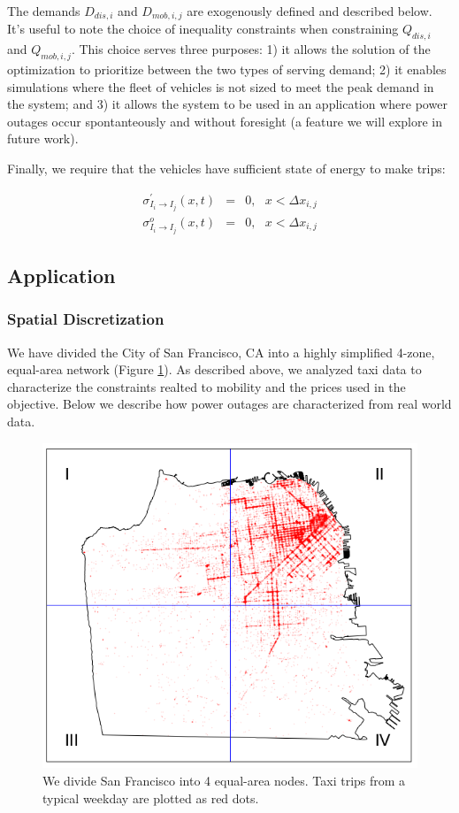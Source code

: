 \documentclass[journal]{IEEEtran}
\begin{document}
The demands $D_{dis,i}$ and $D_{mob,i,j}$ are exogenously defined and described below. It's useful to note the choice of inequality constraints when constraining $Q_{dis,i}$ and $Q_{mob,i,j}$. This choice serves three purposes: 1) it allows the solution of the optimization to prioritize between the two types of serving demand; 2) it enables simulations where the fleet of vehicles is not sized to meet the peak demand in the system; and 3) it allows the system to be used in an application where power outages occur spontanteously and without foresight (a feature we will explore in future work). 

Finally, we require that the vehicles have sufficient state of energy to make trips:

\begin{eqnarray*}
    \sigma_{I_i \rightarrow I_j}^\prime(x,t) & = & 0, ~~~ x < \Delta x_{i,j} \\
    \sigma_{I_i \rightarrow I_j}^o(x,t) & = & 0, ~~~ x < \Delta x_{i,j}
\end{eqnarray*}

\subsection{Application}

\subsubsection{Spatial Discretization}
We have divided the City of San Francisco, CA into a highly simplified 4-zone, equal-area network (Figure \ref{fig:sf}). As described above, we analyzed taxi data to characterize the constraints realted to mobility and the prices used in the objective. Below we describe how power outages are characterized from real world data.

\begin{figure}[!htbp]
  \includegraphics[width=\linewidth]{plots/grid1-cropped.png}
  \caption{We divide San Francisco into 4 equal-area nodes. Taxi trips from a typical weekday are plotted as red dots.}
  \label{fig:sf}
\end{figure}
\end{document}
